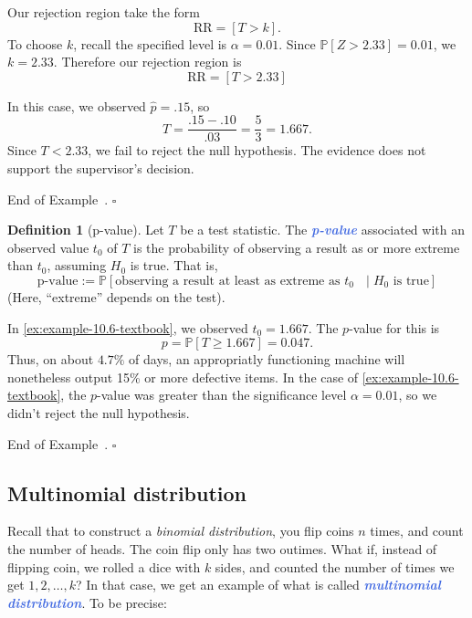 \documentclass[10pt]{article}
\theoremstyle{definition}
\newtheorem{definition}[theorem]{Definition}
\newtheorem{example}[theorem]{Example}
\renewenvironment{example}
{\begin{oldexample}}
  {\par\smallskip\hfill   End of Example~\theexample. $\square$    \par\end{oldexample}}
\newcommand{\1}[1]{\textbf{1}_{\left[#1\right]}} %
\def\P{\mathbb{P}} %
\newcommand{\demph}[1]{\textcolor{RoyalBlue}{\textbf{\slshape #1}}} %
\begin{document}
\begin{example}[Example 10.6 in textbook]
\begin{center}
  \end{center}
  Our rejection region take the form
  \begin{equation*}
    \text{RR}=\left[ T>k \right].
  \end{equation*}
  To choose $k$, recall the specified level is $\alpha=0.01$. Since
  $\P\left[Z>2.33 \right]=0.01$, we $k=2.33$. Therefore our rejection region
  is
  \begin{equation*}
    \text{RR}=\left[ T>2.33 \right] 
  \end{equation*}

  In this case, we observed $\widehat{p}=.15$, so
  \begin{equation*}
    T = \frac{.15-.10}{.03} = \frac{5}{3}=1.667.
  \end{equation*}
  Since $T<2.33$, we fail to reject the null hypothesis. The evidence does not
  support the supervisor's decision.
\end{example}

\begin{definition}[p-value]
  \label{def:p-value}
  Let $T$ be a test statistic. The \demph{p-value} associated with an observed
  value $t_{0}$ of $T$ is the probability of observing a result as or more
  extreme than $t_{0}$, assuming $H_{0}$ is true.  That is,
  \begin{equation*}
    \text{p-value} := \P\left[\text{observing a result at least as extreme as
        $t_0$ }\mid H_{0} \text{ is true} \right]
  \end{equation*}
  (Here, ``extreme'' depends on the test).
\end{definition}

\begin{example}
  In \cref{ex:example-10.6-textbook}, we observed $t_{0}=1.667$. The $p$-value
  for this is
  \begin{equation*}
    p = \P\left[ T \geq 1.667\right] = 0.047.
  \end{equation*}
  Thus, on about $4.7\%$ of days, an appropriatly functioning machine will
  nonetheless output 15\% or more defective items. In the case of
  \cref{ex:example-10.6-textbook}, the $p$-value was greater than the
  significance level $\alpha=0.01$, so we didn't reject the null hypothesis.
\end{example}

\subsection{Multinomial distribution}
Recall that to construct a \textit{binomial distribution}, you flip coins
$n$ times, and count the number of heads. The coin flip only has two outimes.
What if, instead of flipping coin, we rolled a dice with $k$ sides, and
counted the number of times we get $1,2,\ldots,k$? In that case, we get an
example of what is called \demph{multinomial distribution}. To be precise:
\end{document}

